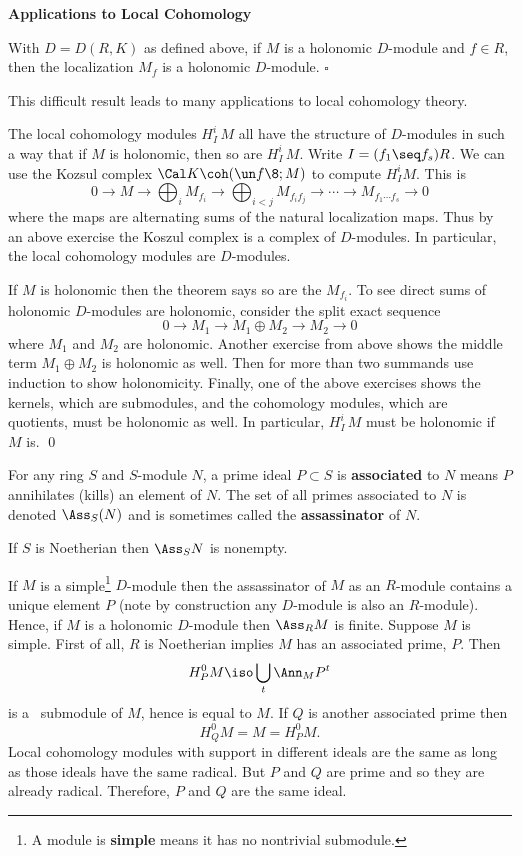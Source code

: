 
\bigskip
\centerline{\bf Applications to Local Cohomology}
\bigskip

 With $D=D(R,K)$ as defined above, if $M$ is a holonomic $D$-module and $f\in R$, then the localization $M_f$ is a holonomic $D$-module. $\square$ \endproclaim

\flushpar This difficult result leads to many applications to local cohomology theory.

\proclaim{\Cor} The local cohomology modules $H^i_ I\,M$ all have the structure of $D$-modules in such a way that if $M$ is holonomic, then so are $H^i_I\,M$. \endproclaim
\pf Write $I=(f_1\seq f_s)R$. We can use the Kozsul complex $\Cal K\coh(\un f\8;M)$ to compute $H^i_ IM$.  This is 
$$0\to M\to\bigoplus_iM_{f_i}\to\bigoplus_{i<j}M_{f_if_j}\to\cdots\to M_{f_1\cdots f_s}\to 0$$
where the maps are alternating sums of the natural localization maps.  Thus by an above exercise the Koszul complex is a complex of $D$-modules.  In particular, the local cohomology modules are $D$-modules.  

If $M$ is holonomic then the theorem says so are the $M_{f_i}$.  To see direct sums of holonomic $D$-modules are holonomic, consider the split exact sequence
$$0\to M_1\to M_1\oplus M_2\to M_2\to 0$$
where $M_1$ and $M_2$ are holonomic.  Another exercise from above shows the middle term $M_1\oplus M_2$ is holonomic as well.  Then for more than two summands use induction to show holonomicity.  Finally, one of the above exercises shows the kernels, which are submodules, and the cohomology modules, which are quotients, must be holonomic as well.  In particular, $H^i_I\,M$ must be holonomic if $M$ is. \qed

For any ring $S$ and $S$-module $N$, a prime ideal $P\subset S$ is {\bf associated} to $N$ means $P$ annihilates (kills) an element of $N$.  The set of all primes associated to $N$ is denoted $\Ass_S(N)$ and is sometimes called the {\bf assassinator} of $N$.

\demo{\bf\Exe} If $S$ is Noetherian then $\Ass_SN$ is nonempty. \enddemo

\proclaim{\Cor} If $M$ is a simple\footnote{A module is {\bf simple} means it has no nontrivial submodule.} $D$-module then the assassinator of $M$ as an $R$-module contains a unique element $P$ (note by construction any $D$-module is also an $R$-module).  Hence, if $M$ is a holonomic $D$-module then $\Ass_RM$ is finite. \endproclaim
\pf Suppose $M$ is simple.  First of all, $R$ is Noetherian implies $M$ has an associated prime, $P$.  Then $$H^0_PM\iso\bigcup_t\Ann_MP^t$$ 
is a \nz\ submodule of $M$, hence is equal to $M$.  If $Q$ is another associated prime then 
$$H^0_QM=M=H^0_PM.$$
Local cohomology modules with support in different ideals are the same as long as those ideals have the same radical.  But $P$ and $Q$ are prime and so they are already radical.  Therefore, $P$ and $Q$ are the same ideal.

